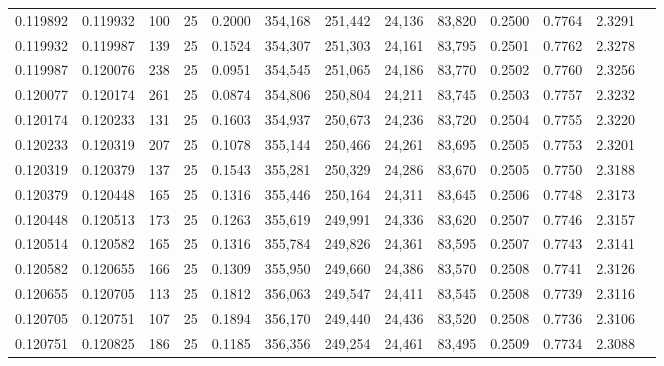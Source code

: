 \begin{tabular}{rrrrrrrrrrrrr}
0.119892 & 0.119932 &   100 &  25 &                                     0.2000 & 354,168 & 251,442 &  24,136 &  83,820 & 0.2500 & 0.7764 & 2.3291 \\
0.119932 & 0.119987 &   139 &  25 &                                     0.1524 & 354,307 & 251,303 &  24,161 &  83,795 & 0.2501 & 0.7762 & 2.3278 \\
0.119987 & 0.120076 &   238 &  25 &                                     0.0951 & 354,545 & 251,065 &  24,186 &  83,770 & 0.2502 & 0.7760 & 2.3256 \\
0.120077 & 0.120174 &   261 &  25 &                                     0.0874 & 354,806 & 250,804 &  24,211 &  83,745 & 0.2503 & 0.7757 & 2.3232 \\
0.120174 & 0.120233 &   131 &  25 &                                     0.1603 & 354,937 & 250,673 &  24,236 &  83,720 & 0.2504 & 0.7755 & 2.3220 \\
0.120233 & 0.120319 &   207 &  25 &                                     0.1078 & 355,144 & 250,466 &  24,261 &  83,695 & 0.2505 & 0.7753 & 2.3201 \\
0.120319 & 0.120379 &   137 &  25 &                                     0.1543 & 355,281 & 250,329 &  24,286 &  83,670 & 0.2505 & 0.7750 & 2.3188 \\
0.120379 & 0.120448 &   165 &  25 &                                     0.1316 & 355,446 & 250,164 &  24,311 &  83,645 & 0.2506 & 0.7748 & 2.3173 \\
0.120448 & 0.120513 &   173 &  25 &                                     0.1263 & 355,619 & 249,991 &  24,336 &  83,620 & 0.2507 & 0.7746 & 2.3157 \\
0.120514 & 0.120582 &   165 &  25 &                                     0.1316 & 355,784 & 249,826 &  24,361 &  83,595 & 0.2507 & 0.7743 & 2.3141 \\
0.120582 & 0.120655 &   166 &  25 &                                     0.1309 & 355,950 & 249,660 &  24,386 &  83,570 & 0.2508 & 0.7741 & 2.3126 \\
0.120655 & 0.120705 &   113 &  25 &                                     0.1812 & 356,063 & 249,547 &  24,411 &  83,545 & 0.2508 & 0.7739 & 2.3116 \\
0.120705 & 0.120751 &   107 &  25 &                                     0.1894 & 356,170 & 249,440 &  24,436 &  83,520 & 0.2508 & 0.7736 & 2.3106 \\
0.120751 & 0.120825 &   186 &  25 &                                     0.1185 & 356,356 & 249,254 &  24,461 &  83,495 & 0.2509 & 0.7734 & 2.3088 \\

\end{tabular}
